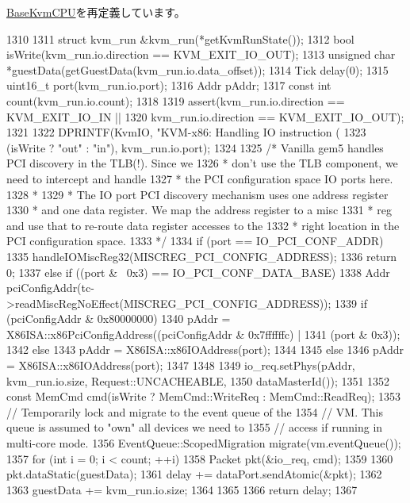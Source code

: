 \hyperlink{classBaseKvmCPU_a404fbd80d6676724d026a932b2258dc7}{BaseKvmCPU}を再定義しています。


\begin{DoxyCode}
1310 {
1311     struct kvm_run &kvm_run(*getKvmRunState());
1312     bool isWrite(kvm_run.io.direction == KVM_EXIT_IO_OUT);
1313     unsigned char *guestData(getGuestData(kvm_run.io.data_offset));
1314     Tick delay(0);
1315     uint16_t port(kvm_run.io.port);
1316     Addr pAddr;
1317     const int count(kvm_run.io.count);
1318 
1319     assert(kvm_run.io.direction == KVM_EXIT_IO_IN ||
1320            kvm_run.io.direction == KVM_EXIT_IO_OUT);
1321 
1322     DPRINTF(KvmIO, "KVM-x86: Handling IO instruction (%
1323             (isWrite ? "out" : "in"), kvm_run.io.port);
1324 
1325     /* Vanilla gem5 handles PCI discovery in the TLB(!). Since we
1326      * don't use the TLB component, we need to intercept and handle
1327      * the PCI configuration space IO ports here.
1328      *
1329      * The IO port PCI discovery mechanism uses one address register
1330      * and one data register. We map the address register to a misc
1331      * reg and use that to re-route data register accesses to the
1332      * right location in the PCI configuration space.
1333      */
1334     if (port == IO_PCI_CONF_ADDR) {
1335         handleIOMiscReg32(MISCREG_PCI_CONFIG_ADDRESS);
1336         return 0;
1337     } else if ((port & ~0x3) == IO_PCI_CONF_DATA_BASE) {
1338         Addr pciConfigAddr(tc->readMiscRegNoEffect(MISCREG_PCI_CONFIG_ADDRESS));
1339         if (pciConfigAddr & 0x80000000) {
1340             pAddr = X86ISA::x86PciConfigAddress((pciConfigAddr & 0x7ffffffc) |
1341                                                 (port & 0x3));
1342         } else {
1343             pAddr = X86ISA::x86IOAddress(port);
1344         }
1345     } else {
1346         pAddr = X86ISA::x86IOAddress(port);
1347     }
1348 
1349     io_req.setPhys(pAddr, kvm_run.io.size, Request::UNCACHEABLE,
1350                    dataMasterId());
1351 
1352     const MemCmd cmd(isWrite ? MemCmd::WriteReq : MemCmd::ReadReq);
1353     // Temporarily lock and migrate to the event queue of the
1354     // VM. This queue is assumed to "own" all devices we need to
1355     // access if running in multi-core mode.
1356     EventQueue::ScopedMigration migrate(vm.eventQueue());
1357     for (int i = 0; i < count; ++i) {
1358         Packet pkt(&io_req, cmd);
1359 
1360         pkt.dataStatic(guestData);
1361         delay += dataPort.sendAtomic(&pkt);
1362 
1363         guestData += kvm_run.io.size;
1364     }
1365 
1366     return delay;
1367 }
\end{DoxyCode}
